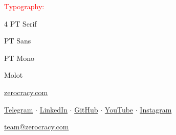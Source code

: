 \documentclass{article}
\newcommand\slide[1]{%
  \pagebreak\topskip0pt\vspace*{\fill}%
  \begin{center}\LARGE%
  #1
  \end{center}%
  \vspace*{\fill}}
\newcommand\header[1]{{\LARGE\textcolor{red}{#1:}\\[1em]\par}}
\begin{document}
\slide{
  \header{Typography}
  \par
  {\Huge\begin{multicols}{4}
  {\rmfamily PT Serif}
  \par\columnbreak\par
  {\sffamily PT Sans}
  \par\columnbreak\par
  {\ttfamily PT Mono}
  \par\columnbreak\par
  {\molotFont Molot}
  \end{multicols}\par}}

\slide{
  \href{https://www.zerocracy.com}{zerocracy.com}
  \par
  \vspace*{1em}
  {\large
  \href{https://t.me/zerocracy}{Telegram}
  \(\cdot\)
  \href{https://www.linkedin.com/company/zerocracy/}{LinkedIn}
  \(\cdot\)
  \href{https://www.github.com/zerocracy/}{GitHub}
  \(\cdot\)
  \href{https://www.youtube.com/playlist?list=PLaIsQH4uc08yC4-991xt-SGSisteMtD_w}{YouTube}
  \(\cdot\)
  \href{https://instagram.com/zerocracy}{Instagram}
  \par}
  \vspace*{1em}
  {\large\href{mailto:team@zerocracy.com}{team@zerocracy.com}\par}}
\end{document}
